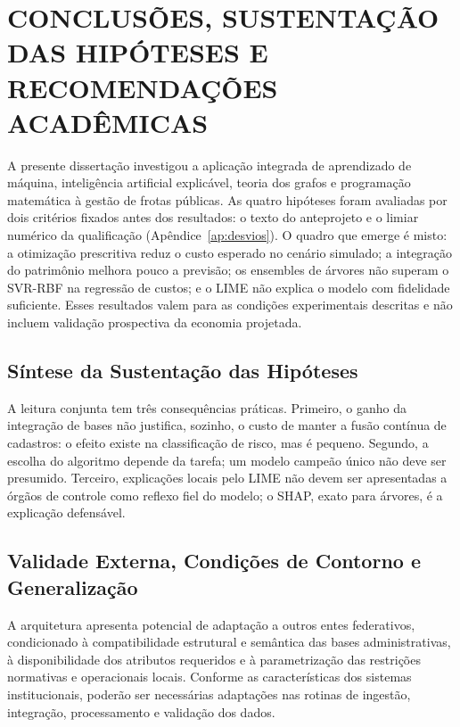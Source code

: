 \chapter{CONCLUSÕES, SUSTENTAÇÃO DAS HIPÓTESES E RECOMENDAÇÕES ACADÊMICAS}
\label{cap:conclusoes}

A presente dissertação investigou a aplicação integrada de aprendizado de máquina, inteligência artificial explicável, teoria dos grafos e programação matemática à gestão de frotas públicas. As quatro hipóteses foram avaliadas por dois critérios fixados antes dos resultados: o texto do anteprojeto e o limiar numérico da qualificação (Apêndice~\ref{ap:desvios}). O quadro que emerge é misto: a otimização prescritiva reduz o custo esperado no cenário simulado; a integração do patrimônio melhora pouco a previsão; os ensembles de árvores não superam o SVR-RBF na regressão de custos; e o LIME não explica o modelo com fidelidade suficiente. Esses resultados valem para as condições experimentais descritas e não incluem validação prospectiva da economia projetada.

\section{Síntese da Sustentação das Hipóteses}



A leitura conjunta tem três consequências práticas. Primeiro, o ganho da integração de bases não justifica, sozinho, o custo de manter a fusão contínua de cadastros: o efeito existe na classificação de risco, mas é pequeno. Segundo, a escolha do algoritmo depende da tarefa; um modelo campeão único não deve ser presumido. Terceiro, explicações locais pelo LIME não devem ser apresentadas a órgãos de controle como reflexo fiel do modelo; o SHAP, exato para árvores, é a explicação defensável.

\section{Validade Externa, Condições de Contorno e Generalização}

A arquitetura apresenta potencial de adaptação a outros entes federativos, condicionado à compatibilidade estrutural e semântica das bases administrativas, à disponibilidade dos atributos requeridos e à parametrização das restrições normativas e operacionais locais. Conforme as características dos sistemas institucionais, poderão ser necessárias adaptações nas rotinas de ingestão, integração, processamento e validação dos dados.

